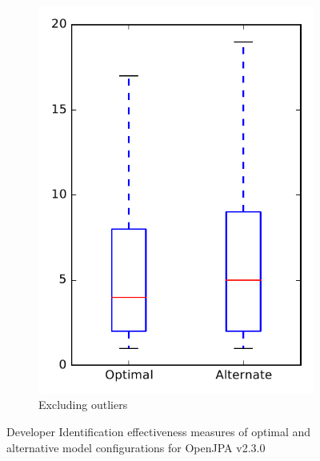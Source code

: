 \begin{figure}
\begin{subfigure}{.4\textwidth}
        \includegraphics[height=0.4\textheight]{figures/combo/dit_rq1_openjpa_no_outlier}
        \caption{Excluding outliers}\label{fig:combo:dit:rq1:openjpa_no_outlier}
    \end{subfigure}
\caption{Developer Identification effectiveness measures of optimal and alternative model configurations for OpenJPA v2.3.0}
\label{fig:combo:dit:rq1:openjpa}
\end{figure}
